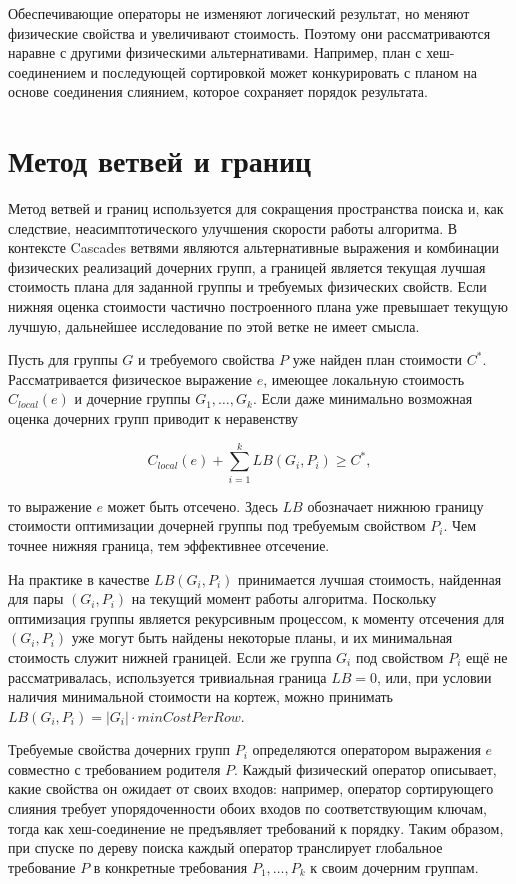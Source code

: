 \documentclass[fontsize=14pt, russian]{scrartcl}
\begin{document}
Обеспечивающие операторы не изменяют логический результат, но меняют физические
свойства и увеличивают стоимость. Поэтому они рассматриваются наравне с другими
физическими альтернативами. Например, план с хеш-соединением и последующей
сортировкой может конкурировать с планом на основе соединения слиянием, которое
сохраняет порядок результата.

\section{Метод ветвей и границ}

Метод ветвей и границ используется для сокращения пространства поиска и, как
следствие, неасимптотического улучшения скорости работы алгоритма. В контексте
Cascades ветвями являются альтернативные выражения и комбинации физических
реализаций дочерних групп, а границей является текущая лучшая стоимость плана
для заданной группы и требуемых физических свойств. Если нижняя оценка стоимости
частично построенного плана уже превышает текущую лучшую, дальнейшее
исследование по этой ветке не имеет смысла.

Пусть для группы \(G\) и требуемого свойства \(P\) уже найден план стоимости
\(C^*\). Рассматривается физическое выражение \(e\), имеющее локальную стоимость
\(C_{local}(e)\) и дочерние группы \(G_1, \ldots, G_k\). Если даже минимально
возможная оценка дочерних групп приводит к неравенству

\[
    C_{local}(e) + \sum_{i=1}^{k} LB(G_i, P_i) \geq C^*,
\]

то выражение \(e\) может быть отсечено. Здесь \(LB\) обозначает нижнюю границу
стоимости оптимизации дочерней группы под требуемым свойством \(P_i\). Чем
точнее нижняя граница, тем эффективнее отсечение.

На практике в качестве \(LB(G_i, P_i)\) принимается лучшая стоимость, найденная
для пары \((G_i, P_i)\) на текущий момент работы алгоритма. Поскольку
оптимизация группы является рекурсивным процессом, к моменту отсечения для
\((G_i, P_i)\) уже могут быть найдены некоторые планы, и их минимальная
стоимость служит нижней границей. Если же группа \(G_i\) под свойством \(P_i\)
ещё не рассматривалась, используется тривиальная граница \(LB = 0\), или, при
условии наличия минимальной стоимости на кортеж, можно принимать
\(LB(G_i, P_i) = |G_i| \cdot \mathit{minCostPerRow}\).

Требуемые свойства дочерних групп \(P_i\) определяются оператором выражения \(e\)
совместно с требованием родителя \(P\). Каждый физический оператор описывает, какие
свойства он ожидает от своих входов: например, оператор сортирующего слияния требует
упорядоченности обоих входов по соответствующим ключам, тогда как хеш-соединение не
предъявляет требований к порядку. Таким образом, при спуске по дереву поиска каждый
оператор транслирует глобальное требование \(P\) в конкретные требования \(P_1,
\ldots, P_k\) к своим дочерним группам.
\end{document}
